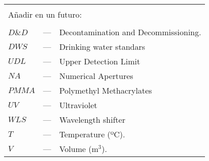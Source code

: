\begin{longtable}{p{25mm} c p{120mm} }
\\
\\
\multicolumn{3}{l}{Añadir en un futuro:}\\
\\
$D\&D$ & --- & Decontamination and Decommissioning.\\
$DWS$ & --- & Drinking water standars\\
$UDL$ & --- & Upper Detection Limit\\


$NA$ & --- & Numerical Apertures\\
$PMMA$ & --- & Polymethyl Methacrylates\\
$UV$ & --- & Ultraviolet\\
$WLS$ & --- & Wavelength shifter\\
$T$ & --- & Temperature (ºC).\\
$V$ & --- & Volume (m$^3$).\\
\end{longtable}
